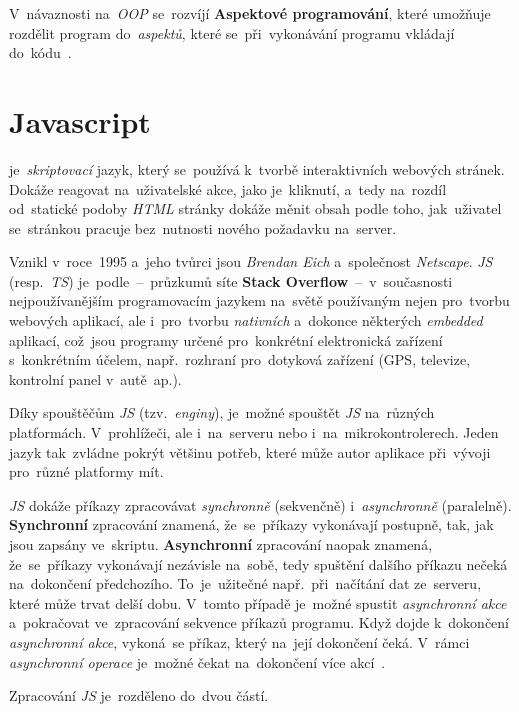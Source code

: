 \documentclass[11pt,a4paper]{report}
\newcommand{\acrdefprint}[3][full]{%
    \newacronym{#2}{#2}{#3}%
    \ifthenelse{\equal{#1}{short}}{%
        \textbf{\acrshort{#2}}%
    }{%
        \ifthenelse{\equal{#1}{long}}{%
            \textbf{\acrlong*{#2}}%
        }{%
            \textbf{\acrfull*{#2}}%
        }%
    }%
}
\let\oldacrshort\acrshort
\renewcommand{\acrshort}[1]{\emph{\normalsize\color[rgb]{0,0,0}\noindent\oldacrshort{#1}}}
\begin{document}
            V~návaznosti na~\emph{OOP} se~rozvíjí \textbf{Aspektové programování}, které umožňuje rozdělit program do~\emph{aspektů}, které se~při~vykonávání programu vkládají do~kódu~\cite{macurova2012:aspektove}.

        \section{Javascript}
            \acrdefprint{JS}{Javascript} je~\emph{skriptovací} jazyk, který se~používá k~tvorbě interaktivních webových stránek. Dokáže reagovat na~uživatelské akce, jako je~kliknutí, a~tedy na~rozdíl od~statické podoby \acrshort{HTML} stránky dokáže měnit obsah podle toho, jak~uživatel se~stránkou pracuje bez~nutnosti nového požadavku na~server.

            Vznikl v~roce~1995 a~jeho tvůrci jsou \emph{Brendan Eich} a~společnost \emph{Netscape}. \acrshort{JS} (resp.~\acrshort{TS}) je~podle~--~průzkumů síte \textbf{Stack Overflow}~--~v~současnosti nejpoužívanějším programovacím jazykem na~světě používaným nejen pro~tvorbu webových aplikací, ale i~pro~tvorbu \emph{nativních} a~dokonce některých \emph{embedded} aplikací, což~jsou programy určené pro~konkrétní elektronická zařízení s~konkrétním účelem, např.~rozhraní pro~dotyková zařízení (GPS, televize, kontrolní panel v~autě~ap.).

            Díky spouštěčům \acrshort{JS} (tzv.~\emph{enginy}), je~možné spouštět \acrshort{JS} na~různých platformách. V~prohlížeči, ale i~na~serveru nebo i~na~mikrokontrolerech. Jeden jazyk tak~zvládne pokrýt většinu potřeb, které může autor aplikace při~vývoji pro~různé platformy mít.

            \acrshort{JS} dokáže příkazy zpracovávat \emph{synchronně} (sekvenčně) i~\emph{asynchronně} (paralelně). \textbf{Synchronní} zpracování znamená, že~se~příkazy vykonávají postupně, tak, jak jsou zapsány ve~skriptu. \textbf{Asynchronní} zpracování naopak znamená, že~se~příkazy vykonávají nezávisle na~sobě, tedy spuštění dalšího příkazu nečeká na~dokončení předchozího. To~je~užitečné např.~při~načítání dat ze~serveru, které může trvat delší dobu. V~tomto případě je~možné spustit \emph{asynchronní akce} a~pokračovat ve~zpracování sekvence příkazů programu. Když dojde k~dokončení \emph{asynchronní akce}, vykoná~se příkaz, který na~její dokončení čeká. V~rámci \emph{asynchronní operace} je~možné čekat na~dokončení více akcí~\cite{ajax:mdn, Scott2019:programmingpragmatics}.

            Zpracování \acrshort{JS} je~rozděleno do~dvou částí.
            
\end{document}
